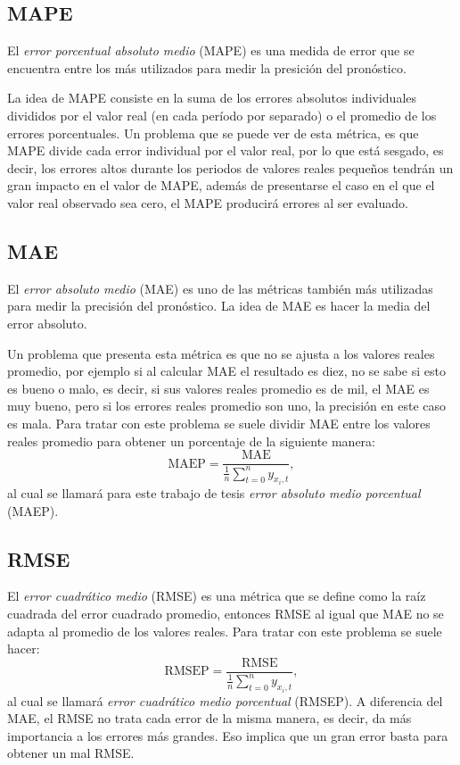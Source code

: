 \subsection{MAPE}
El {\em error porcentual absoluto medio} (MAPE) es una medida de error que se encuentra entre los más utilizados para medir la presición del pronóstico.

La idea de MAPE consiste en la suma de los errores absolutos individuales divididos por el valor real (en cada período por separado) o el promedio de los errores porcentuales.  Un problema que se puede ver de esta métrica, es que MAPE divide cada error individual por el valor real, por lo que está sesgado, es decir, los errores altos durante los periodos de valores reales pequeños tendrán un gran impacto en el valor de MAPE, además de presentarse el caso en el que el valor real observado sea cero, el MAPE producirá errores al ser evaluado.

\subsection{MAE}
El {\em error absoluto medio} (MAE) es uno de las métricas también más utilizadas para medir la precisión del pronóstico. La idea de MAE es hacer la media del error absoluto.

Un problema que presenta esta métrica es que no se ajusta a los valores reales promedio, por ejemplo si al calcular MAE el resultado es diez, no se sabe si esto es bueno o malo, es decir, si sus valores reales promedio es de mil, el MAE es muy bueno, pero si los errores reales promedio son uno, la precisión en este caso es mala. Para tratar con este problema se suele dividir MAE entre los valores reales promedio para obtener un porcentaje de la siguiente manera: \[ \text{MAEP} = \frac{\text{MAE}}{\frac{1}{n}\sum_{t=0}^{n} y_{x_{i},t}}, \]
al cual se llamará para este trabajo de tesis {\em error absoluto medio porcentual} (MAEP).
\subsection{RMSE}
El {\em error cuadrático medio} (RMSE) es una métrica que se define como la raíz cuadrada del error cuadrado promedio, entonces RMSE al igual que MAE no se adapta al promedio de los valores reales. Para tratar con este problema se suele hacer:
\[\text{RMSEP} = \frac{\text{RMSE}}{\frac{1}{n}\sum_{t=0}^{n} y_{x_{i},t}}, \]
al cual se llamará {\em error cuadrático medio porcentual} (RMSEP). A diferencia del MAE, el RMSE no trata cada error de la misma manera, es decir, da más importancia a los errores más grandes. Eso implica que un gran error basta para obtener un mal RMSE.

